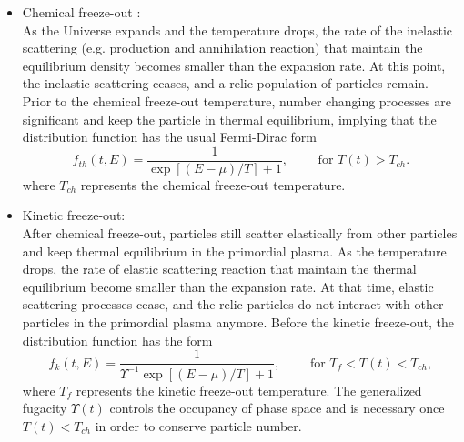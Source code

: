 \begin{itemize}
\item Chemical freeze-out :\\
As the Universe expands and the temperature drops, the rate of the inelastic scattering (e.g. production and annihilation reaction) that maintain the equilibrium density becomes smaller than the expansion rate. At this point, the inelastic scattering ceases, and a relic population of particles remain. Prior to the chemical freeze-out temperature, number changing processes are significant and keep the particle in thermal equilibrium, implying that the distribution function has the usual Fermi-Dirac form 
\begin{equation}\label{equilibrium}
f_{th}(t,E)=\frac{1}{\exp[(E-\mu)/T]+1},\qquad \text{ for } T(t)> T_{ch}.
\end{equation}
where $T_{ch}$ represents the chemical freeze-out temperature.


\item Kinetic freeze-out:\\
After chemical freeze-out, particles  still scatter elastically from other particles and keep thermal equilibrium in the primordial plasma. As the temperature drops, the rate of elastic scattering reaction that maintain the thermal equilibrium become smaller than the expansion rate. At that time, elastic scattering processes cease, and the relic particles do not interact with other particles in the primordial plasma anymore. Before the kinetic freeze-out, the distribution function has the form
\begin{equation}\label{kinetic_equilib}
f_k(t,E)=\frac{1}{\Upsilon^{-1}\exp[(E-\mu)/T]+1},\qquad \text{ for }T_f< T(t)< T_{ch},
\end{equation}
where $T_f$ represents the kinetic freeze-out temperature. The generalized fugacity $\Upsilon(t)$ controls the occupancy of phase space and is necessary once $T(t)<T_{ch}$ in order to conserve particle number.



\end{itemize}

